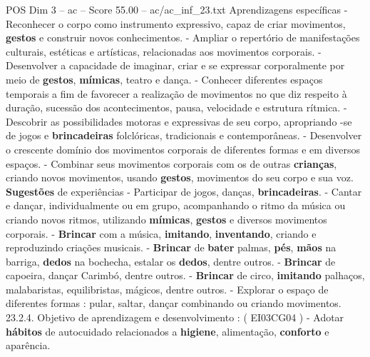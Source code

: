 \begin{textsample}{POS Dim 3 – ac – Score 55.00 – ac/ac\_inf\_23.txt}
Aprendizagens específicas - Reconhecer o corpo como instrumento expressivo, capaz de criar movimentos, \textbf{gestos} e construir novos conhecimentos. - Ampliar o repertório de manifestações culturais, estéticas e artísticas, relacionadas aos movimentos corporais. - Desenvolver a capacidade de imaginar, criar e se expressar corporalmente por meio de \textbf{gestos}, \textbf{mímicas}, teatro e dança. - Conhecer diferentes espaços temporais a fim de favorecer a realização de movimentos no que diz respeito à duração, sucessão dos acontecimentos, pausa, velocidade e estrutura rítmica. - Descobrir as possibilidades motoras e expressivas de seu corpo, apropriando -se de jogos e \textbf{brincadeiras} folclóricas, tradicionais e contemporâneas. - Desenvolver o crescente domínio dos movimentos corporais de diferentes formas e em diversos espaços. - Combinar seus movimentos corporais com os de outras \textbf{crianças}, criando novos movimentos, usando \textbf{gestos}, movimentos do seu corpo e sua voz. \textbf{Sugestões} de experiências - Participar de jogos, danças, \textbf{brincadeiras}. - Cantar e dançar, individualmente ou em grupo, acompanhando o ritmo da música ou criando novos ritmos, utilizando \textbf{mímicas}, \textbf{gestos} e diversos movimentos corporais. - \textbf{Brincar} com a música, \textbf{imitando}, \textbf{inventando}, criando e reproduzindo criações musicais. - \textbf{Brincar} de \textbf{bater} palmas, \textbf{pés}, \textbf{mãos} na barriga, \textbf{dedos} na bochecha, estalar os \textbf{dedos}, dentre outros. - \textbf{Brincar} de capoeira, dançar Carimbó, dentre outros. - \textbf{Brincar} de circo, \textbf{imitando} palhaços, malabaristas, equilibristas, mágicos, dentre outros. - Explorar o espaço de diferentes formas : pular, saltar, dançar combinando ou criando movimentos. 23.2.4.
Objetivo de aprendizagem e desenvolvimento : ( EI03CG04 ) - Adotar \textbf{hábitos} de autocuidado relacionados a \textbf{higiene}, alimentação, \textbf{conforto} e aparência.

\end{textsample}
